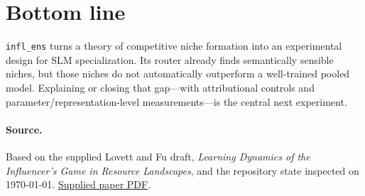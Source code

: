 \documentclass[11pt]{article}
\begin{document}
\section{Bottom line}
\texttt{infl\_ens} turns a theory of competitive niche formation into an experimental
design for SLM specialization. Its router already finds semantically sensible niches, but
those niches do not automatically outperform a well-trained pooled model. Explaining or
closing that gap---with attributional controls and parameter/representation-level
measurements---is the central next experiment.

\paragraph{Source.} Based on the supplied Lovett and Fu draft, \emph{Learning Dynamics
of the Influencer's Game in Resource Landscapes}, and the repository state inspected on
\today. \href{https://www.dropbox.com/scl/fi/ui1pp36tm9mo1rh61wiki/public_facing_draft.pdf?rlkey=ybb9j0ekqlvwsy3puibwojnuf&dl=0}{Supplied paper PDF}.
\end{document}
